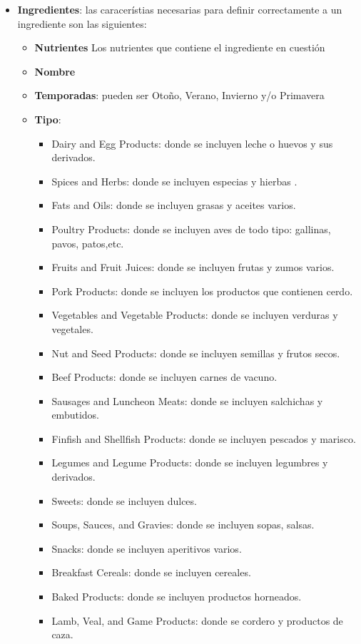 \documentclass[12]{article}
\begin{document}
\begin{itemize}
	\item \textbf{Ingredientes}: las caracerístias necesarias para definir correctamente a un ingrediente son las siguientes: \begin{itemize}
		\item \textbf{Nutrientes} Los nutrientes que contiene el ingrediente en cuestión
		\item \textbf{Nombre}
		\item \textbf{Temporadas}: pueden ser Otoño, Verano, Invierno y/o Primavera
		\item \textbf{Tipo}: \begin{itemize}
			\item Dairy and Egg Products: donde se incluyen leche o huevos y sus derivados.
			\item Spices and Herbs: donde se incluyen especias y hierbas .
			\item Fats and Oils: donde se incluyen grasas y aceites varios.
			\item Poultry Products: donde se incluyen aves de todo tipo: gallinas, pavos, patos,etc.
			\item Fruits and Fruit Juices: donde se incluyen frutas y zumos varios. 
			\item Pork Products: donde se incluyen los productos que contienen cerdo.
			\item Vegetables and Vegetable Products: donde se incluyen verduras y vegetales.
			\item Nut and Seed Products: donde se incluyen semillas y frutos secos.
			\item Beef Products: donde se incluyen carnes de vacuno.
			\item Sausages and Luncheon Meats: donde se incluyen salchichas y embutidos.
			\item Finfish and Shellfish Products: donde se incluyen pescados y marisco.
			\item Legumes and Legume Products: donde se incluyen legumbres y derivados.
			\item Sweets: donde se incluyen dulces.
			\item Soups, Sauces, and Gravies: donde se incluyen sopas, salsas.
			\item Snacks: donde se incluyen aperitivos varios.
			\item Breakfast Cereals: donde se incluyen cereales.
			\item Baked Products: donde se incluyen productos horneados.
			\item Lamb, Veal, and Game Products: donde se cordero y productos de caza.

\end{itemize}
\end{itemize}
\end{itemize}
\end{document}
